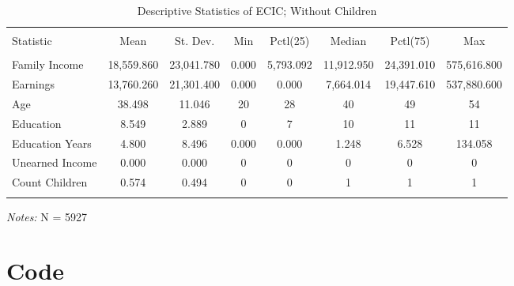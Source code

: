 \documentclass[a4paper]{article}
\begin{document}
\begin{table}[!htbp] 
\begin{adjustwidth}{-0cm}{-0cm}
\begin{threeparttable}
\small
\captionsetup{font=small, justification=raggedright,singlelinecheck=false}
  \caption{Descriptive Statistics of ECIC; Without Children} 
  \label{} 
\begin{tabular}{@{\extracolsep{5pt}}lccccccc} 
\\[-1.8ex]\hline 
\hline \\[-1.8ex] 
Statistic & \multicolumn{1}{c}{Mean} & \multicolumn{1}{c}{St. Dev.} & \multicolumn{1}{c}{Min} & \multicolumn{1}{c}{Pctl(25)} & \multicolumn{1}{c}{Median} & \multicolumn{1}{c}{Pctl(75)} & \multicolumn{1}{c}{Max} \\ 
\hline \\[-1.8ex] 
Family Income & 18,559.860 & 23,041.780 & 0.000 & 5,793.092 & 11,912.950 & 24,391.010 & 575,616.800 \\ 
Earnings & 13,760.260 & 21,301.400 & 0.000 & 0.000 & 7,664.014 & 19,447.610 & 537,880.600 \\ 
Age & 38.498 & 11.046 & 20 & 28 & 40 & 49 & 54 \\ 
Education & 8.549 & 2.889 & 0 & 7 & 10 & 11 & 11 \\ 
Education Years & 4.800 & 8.496 & 0.000 & 0.000 & 1.248 & 6.528 & 134.058 \\ 
Unearned Income & 0.000 & 0.000 & 0 & 0 & 0 & 0 & 0 \\ 
Count Children & 0.574 & 0.494 & 0 & 0 & 1 & 1 & 1 \\ 
\hline \\[-1.8ex] 
\end{tabular} 
\begin{tablenotes}
      \small
      \item\textit{Notes:} N = 5927
    \end{tablenotes}
\end{threeparttable}
\end{adjustwidth}
\end{table}



\section{Code}
\end{document}
